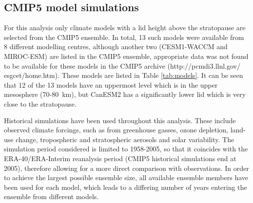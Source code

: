 \subsection{CMIP5 model simulations}

For this analysis only climate models with a lid height above the stratopause
are selected from the CMIP5 ensemble. In total, 13 such models were available
from 8 different modelling centres, although another two (CESM1-WACCM and
MIROC-ESM) are listed in the CMIP5 ensemble, appropriate data was not found to
be available for these models in the CMIP5 archive (http://pcmdi3.llnl.gov/
esgcet/home.htm). These models are listed in Table \ref{tab:models}. It can be
seen that 12 of the 13 models have an uppermost level which is in the upper
mesosphere (70-80~km), but CanESM2 has a significantly lower lid which is very
close to the stratopause.

Historical simulations have been used throughout this analysis. These include
observed climate forcings, such as from greenhouse gasses, ozone depletion,
land-use change, tropospheric and stratospheric aerosols and solar
variability. The simulation period considered is limited to 1958-2005, so that
it coincides with the ERA-40/ERA-Interim reanalysis period (CMIP5 historical
simulations end at 2005), therefore allowing for a more direct comparison with
observations. In order to achieve the largest possible ensemble size, all
available ensemble members have been used for each model, which leads to a
differing number of years entering the ensemble from different models.

